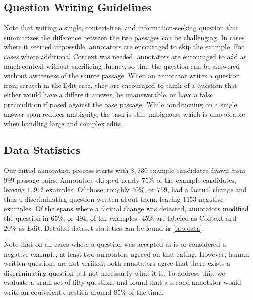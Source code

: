 \subsection{Question Writing Guidelines}
Note that writing a single, context-free, and information-seeking question that summarizes the difference between the two passages can be challenging. In cases where it seemed impossible, annotators are encouraged to skip the example. For cases where additional Context was needed, annotators are encouraged to add as much context without sacrificing fluency, so that the question can be answered without awareness of the source passage. When an annotator writes a question from scratch in the Edit case, they are encouraged to think of a question that either would have a different answer, be unanswerable, or have a false precondition if posed against the base passage. While conditioning on a single answer span reduces ambiguity, the task is still ambiguous, which is unavoidable when handling large and complex edits. 
 
 

 
\subsection{Data Statistics}
Our initial annotation process starts with $8,530$ example candidates drawn from $999$ passage pairs. Annotators skipped nearly $75\%$ of the example candidates, leaving $1,912$ examples. Of those, roughly $40\%$, or $759$, had a factual change and thus a discriminating question written about them, leaving $1153$ negative examples.
% 
Of the spans where a factual change was detected, annotators  modified the question in $65\%$, or $494$, of the examples: $45\%$ are labeled as Context and $20\%$ as Edit. Detailed dataset statistics can be found in \autoref{tab:data}.

Note that on all cases where a question was accepted as is or considered a negative example, at least two annotators agreed on that rating. However, human written questions are not verified; both annotators agree that there exists a discriminating question but not necessarily what it is. To address this, we evaluate a small set of fifty questions and found that a second annotator would write an equivalent question around 85\% of the time.  





